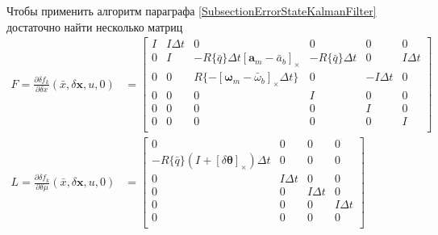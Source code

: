 \documentclass[12pt]{article}
\begin{document}
Чтобы применить алгоритм параграфа \ref{SubsectionErrorStateKalmanFilter} достаточно найти
несколько матриц
\begin{equation}
    \begin{aligned}
        F=\frac{\partial \delta f_k}{\partial \delta x}(\bar{x}, \delta\pmb{x}, u, 0)
         & =\begin{bmatrix}
            I & I\Delta t & 0                                                       & 0                     & 0          & 0          \\
            0 & I         & -R\{\bar{q}\}\Delta t[\pmb{a}_m-\bar{a}_b]_\times       & -R\{\bar{q}\}\Delta t & 0          & I \Delta t \\
            0 & 0         & R\{-[\pmb{\omega}_m - \bar{\omega}_b]_\times \Delta t\} & 0                     & -I\Delta t & 0          \\
            0 & 0         & 0                                                       & I                     & 0          & 0          \\
            0 & 0         & 0                                                       & 0                     & I          & 0          \\
            0 & 0         & 0                                                       & 0                     & 0          & I          \\
        \end{bmatrix} \\
        L=\frac{\partial \delta f_k}{\partial \delta \mu}(\bar{x}, \delta\pmb{x}, u, 0)
         & =\begin{bmatrix}
            0                                                    & 0          & 0          & 0          \\
            -R\{\bar{q}\}(I+[\delta\pmb{\theta}]_\times)\Delta t & 0          & 0          & 0          \\
            0                                                    & I \Delta t & 0          & 0          \\
            0                                                    & 0          & I \Delta t & 0          \\
            0                                                    & 0          & 0          & I \Delta t \\
            0                                                    & 0          & 0          & 0          \\
        \end{bmatrix} \\

\end{aligned}
\end{equation}
\end{document}
